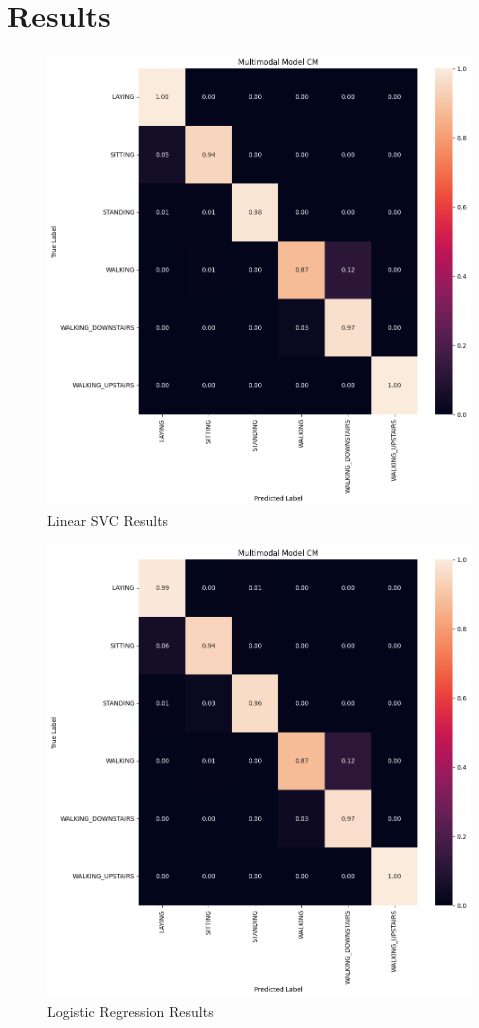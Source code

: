 \documentclass[conference]{IEEEtran}
\begin{document}
\section{Results}
\begin{figure}[h!]
	\includegraphics[width= 0.9 \linewidth]{linearSVC.png}
	\centering
	\caption{Linear SVC Results}
	\label{linearSVC.png}
\end{figure}

\begin{figure}[h!]
	\includegraphics[width= 0.9 \linewidth]{logisticRegression.png}
	\centering
	\caption{Logistic Regression Results}
	\label{logisticRegression.png}
\end{figure}
\end{document}
